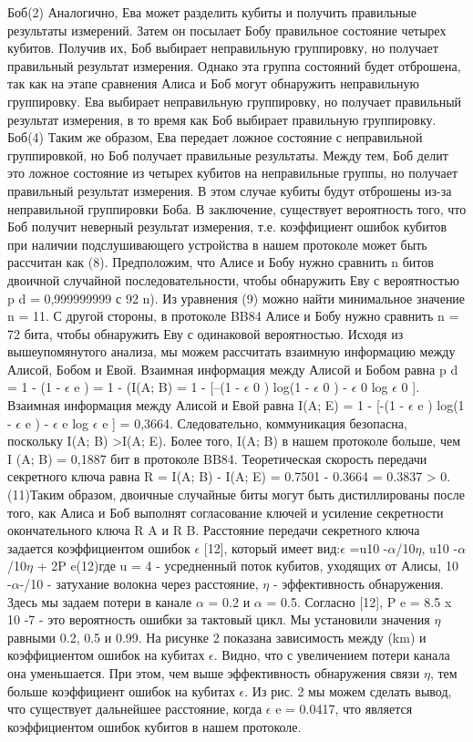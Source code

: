 Боб(2) Аналогично, Ева может разделить кубиты и получить правильные результаты измерений. Затем он посылает Бобу правильное состояние четырех кубитов. Получив их, Боб выбирает неправильную группировку, но получает правильный результат измерения. Однако эта группа состояний будет отброшена, так как на этапе сравнения Алиса и Боб могут обнаружить неправильную группировку.
Ева выбирает неправильную группировку, но получает правильный результат измерения, в то время как Боб выбирает правильную группировку.
Боб(4) Таким же образом, Ева передает ложное состояние с неправильной группировкой, но Боб получает правильные результаты. Между тем, Боб делит это ложное состояние из четырех кубитов на неправильные группы, но получает правильный результат измерения. В этом случае кубиты будут отброшены из-за неправильной группировки Боба.
В заключение, существует вероятность того, что Боб получит неверный результат измерения, т.е. коэффициент ошибок кубитов при наличии подслушивающего устройства в нашем протоколе может быть рассчитан как (8).
Предположим, что Алисе и Бобу нужно сравнить n битов двоичной случайной последовательности, чтобы обнаружить Еву с вероятностью p d = 0,999999999 с 92 n). Из уравнения (9) можно найти минимальное значение n = 11.
С другой стороны, в протоколе BB84 Алисе и Бобу нужно сравнить n = 72 бита, чтобы обнаружить Еву с одинаковой вероятностью. Исходя из вышеупомянутого анализа, мы можем рассчитать взаимную информацию между Алисой, Бобом и Евой. Взаимная информация между Алисой и Бобом равна p d = 1 - (1 - $\epsilon$ e ) = 1 - (I(A; B) = 1 - [--(1 - $\epsilon$ 0 ) log(1 - $\epsilon$ 0 ) - $\epsilon$ 0 log $\epsilon$ 0 ].
Взаимная информация между Алисой и Евой равна I(A; E) = 1 - [-(1 - $\epsilon$ e ) log(1 - $\epsilon$ e ) - $\epsilon$ e log $\epsilon$ e ] = 0,3664.
Следовательно, коммуникация безопасна, поскольку I(A; B) >I(A; E). Более того, I(A; B) в нашем протоколе больше, чем I (A; B) = 0,1887 бит в протоколе BB84.
Теоретическая скорость передачи секретного ключа равна R = I(A; B) - I(A; E) = 0.7501 - 0.3664 = 0.3837 > 0.(11)Таким образом, двоичные случайные биты могут быть дистиллированы после того, как Алиса и Боб выполнят согласование ключей и усиление секретности окончательного ключа R A и R B. Расстояние передачи секретного ключа задается коэффициентом ошибок $\epsilon$ [12], который имеет вид:$\epsilon$ =u10 -$\alpha$/10$\eta$, u10 -$\alpha$/10$\eta$ + 2P e(12)где u = 4 - усредненный поток кубитов, уходящих от Алисы, 10 -$\alpha$-/10 - затухание волокна через расстояние, $\eta$ - эффективность обнаружения. Здесь мы задаем потери в канале $\alpha$ = 0.2 и $\alpha$ = 0.5. Согласно [12], P e = 8.5 x 10 -7 - это вероятность ошибки за тактовый цикл. Мы установили значения $\eta$ равными 0.2, 0.5 и 0.99. На рисунке 2 показана зависимость между (km) и коэффициентом ошибок на кубитах $\epsilon$. Видно, что с увеличением потери канала она уменьшается. При этом, чем выше эффективность обнаружения связи $\eta$, тем больше коэффициент ошибок на кубитах $\epsilon$. Из рис. 2 мы можем сделать вывод, что существует дальнейшее расстояние, когда $\epsilon$ e = 0.0417, что является коэффициентом ошибок кубитов в нашем протоколе.

